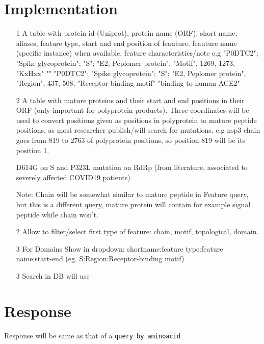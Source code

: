 \documentclass[a4paper, 10pt]{article}
\begin{document}
\section{Implementation} 
\begin{itemize}
\item[1] A table with protein id (Uniprot), protein name (ORF), short name, aliases, feature type, start and end position of feauture, feauture name (specific instance) when available,  feature characteristics/note e.g 
"P0DTC2"; "Spike glycoprotein"; "S"; "E2, Peplomer protein", "Motif", 1269, 1273, "KxHxx" ""
"P0DTC2"; "Spike glycoprotein"; "S"; "E2, Peplomer protein", "Region", 437, 508, "Receptor-binding motif" "binding to human ACE2"

\item[2] A table with mature proteins and their start and end positions in their ORF (only important for polyprotein products). These coordinates will be used to convert positions given as positions in polyprotein to mature peptide positions, as most researcher publish/will search for mutations.
e.g nsp3 chain goes from 819 to 2763 of polyprotein positions, so position 819 will be its position 1. 

D614G on S and P323L mutation on RdRp (from literature, associated to severely affected COVID19 patients) 

 
Note: Chain will be somewhat similar to mature peptide in Feature query, but this is a different query, mature protein will contain for example signal peptide while chain won't.

\item[2] Allow to filter/select first type of feature: chain, motif, topological, domain.

\item[3] For Domains Show in dropdown: shortname:feature type:feature name:start-end (eg. S:Region:Receptor-binding motif)

\item[3] Search in DB will use 


\end{itemize}




\section{Response}
Response will be same as that of a \texttt{query by aminoacid} 
\end{document}
